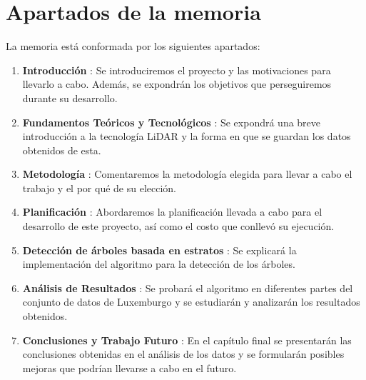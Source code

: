 \section{Apartados de la memoria}
\label{sec:apartados}
La memoria está conformada por los siguientes apartados:
\begin{enumerate}
    \item \textbf{Introducción} : Se introduciremos el proyecto y las motivaciones para llevarlo a cabo. Además, se expondrán los objetivos que perseguiremos durante su desarrollo.

    \item \textbf{Fundamentos Teóricos y Tecnológicos} : Se expondrá una breve introducción a la tecnología LiDAR y la forma en que se guardan los datos obtenidos de esta.
    
    \item \textbf{Metodología} : Comentaremos la metodología elegida para llevar a cabo el trabajo y el por qué de su elección.
    
    \item \textbf{Planificación} : Abordaremos la planificación llevada a cabo para el desarrollo de este proyecto, así como el costo que conllevó su ejecución.
    
    \item \textbf{Detección de árboles basada en estratos} : Se explicará la implementación del algoritmo para la detección de los árboles.
    
    \item \textbf{Análisis de Resultados} : Se probará el algoritmo en diferentes partes del conjunto de datos de Luxemburgo y se estudiarán y analizarán los resultados obtenidos.
    
    \item \textbf{Conclusiones y Trabajo Futuro} : En el capítulo final se presentarán las conclusiones obtenidas en el análisis de los datos y se formularán posibles mejoras que podrían llevarse a cabo en el futuro.


\end{enumerate}

